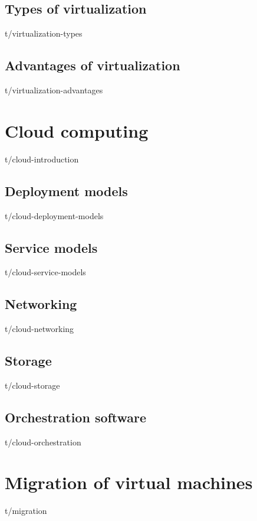 \documentclass[12pt,oneside,a4paper]{report} %
\begin{document}
		\section{Types of virtualization}
		{t/virtualization-types}

		\section{Advantages of virtualization}
		{t/virtualization-advantages}
		\label{subsec:advantages-of-virtualization}

	\chapter{Cloud computing}
		{t/cloud-introduction}

		\section{Deployment models}
		{t/cloud-deployment-models}

		\section{Service models}
		{t/cloud-service-models}

		\section{Networking}
		{t/cloud-networking}

		\section{Storage}
		{t/cloud-storage}

		\section{Orchestration software}
		{t/cloud-orchestration}

	\chapter{Migration of virtual machines}
		{t/migration}

\end{document}
